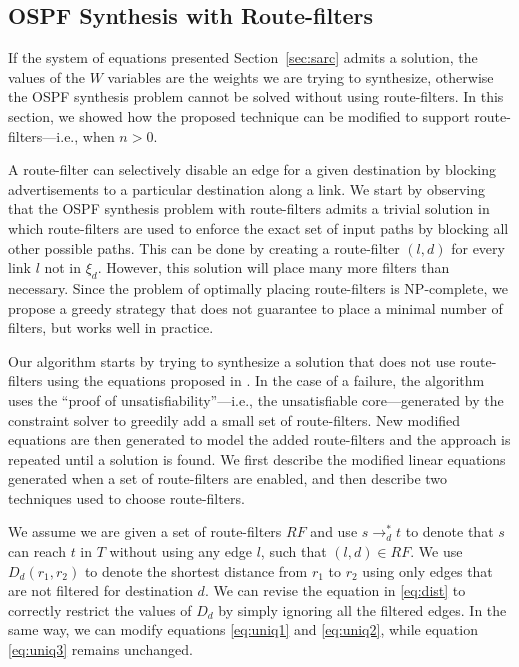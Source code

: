 \subsection{OSPF Synthesis with Route-filters} \label{sec:routefilter}

If the system of equations presented Section~\ref{sec:sarc} admits a solution, 
the values of the $W$ variables are the weights we are trying to synthesize,
otherwise the OSPF synthesis problem cannot be solved without using route-filters.
In this section, we showed how the proposed technique can be modified
to support route-filters---i.e., when $n>0$.

A route-filter  can selectively disable an
edge for a given destination by  blocking advertisements to a
particular destination along a link.
We start by observing that the OSPF synthesis problem with route-filters
admits a trivial solution in which 
route-filters are used to enforce the exact set of input paths by blocking all other possible paths.
This can be done by creating a 
route-filter $(l,d)$ for every link $l$ not in $\xi_d$. 
However, this solution will place many more filters than necessary.
Since the problem of optimally placing route-filters is NP-complete, 
we propose a greedy strategy that does not guarantee to place a minimal number of filters, but works well in practice.


Our algorithm starts by trying to synthesize a solution
that does not use route-filters using the equations proposed in . 
In the case of a failure, the algorithm uses the ``proof of unsatisfiability''---i.e., the unsatisfiable core---generated by 
the constraint solver 
to greedily add a small set of route-filters. 
New modified equations are then generated to model the added route-filters and the approach is repeated until a solution is found.
We first describe the 
modified linear equations generated when a set of
route-filters are enabled, and then describe two
techniques used to choose route-filters. 

We assume we are given a set of route-filters $RF$ and 
use $s\rightarrow_d^* t$ to denote that $s$ can reach $t$
in $T$ without using any edge $l$, such that $(l,d)\in RF$.
We use $D_d(r_1, r_2)$ to denote the shortest distance from $r_1$ to $r_2$
using only edges that are not filtered for destination $d$.
We can revise the equation in \eqref{eq:dist} to correctly restrict the values of $D_d$
by simply ignoring all the filtered edges. 
In the same way, we can modify equations  \eqref{eq:uniq1} and \eqref{eq:uniq2}, while
equation \eqref{eq:uniq3} remains unchanged.

